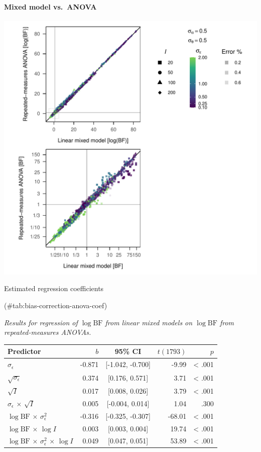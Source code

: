 \documentclass[
  a4paper,
  DIV=11,
  numbers=noendperiod,
  oneside]{scrartcl}
\let\oldparagraph\paragraph
\renewcommand{\paragraph}[1]{\oldparagraph{#1}\mbox{}}
\begin{document}
\hypertarget{mixed-model-vs.-anova}{%
\paragraph{Mixed model vs.~ANOVA}\label{mixed-model-vs.-anova}}

\includegraphics{prior_translation_files/figure-pdf/bias-correction-anova-1.pdf}

Estimated regression coefficients

(\#tab:bias-correction-anova-coef)

\emph{Results for regression of \(\log \mathrm{BF}\) from linear mixed
models on \(\log \mathrm{BF}\) from repeated-measures ANOVAs.}

\begin{longtable}[]{@{}lrcrr@{}}
\toprule()
Predictor & \(b\) & 95\% CI & \(t(1793)\) & \(p\) \\
\midrule()
\endhead
\(\sigma_\epsilon\) & -0.871 & {[}-1.042, -0.700{]} & -9.99 &
\textless{} .001 \\
\(\sqrt{\sigma_\epsilon}\) & 0.374 & {[}0.176, 0.571{]} & 3.71 &
\textless{} .001 \\
\(\sqrt{I}\) & 0.017 & {[}0.008, 0.026{]} & 3.79 & \textless{} .001 \\
\(\sigma_\epsilon\) \(\times\) \(\sqrt{I}\) & 0.005 & {[}-0.004,
0.014{]} & 1.04 & .300 \\
\(\log \mathrm{BF}\) \(\times\) \(\sigma_\epsilon^2\) & -0.316 &
{[}-0.325, -0.307{]} & -68.01 & \textless{} .001 \\
\(\log \mathrm{BF}\) \(\times\) \(\log I\) & 0.003 & {[}0.003, 0.004{]}
& 19.74 & \textless{} .001 \\
\(\log \mathrm{BF}\) \(\times\) \(\sigma_\epsilon^2\) \(\times\)
\(\log I\) & 0.049 & {[}0.047, 0.051{]} & 53.89 & \textless{} .001 \\
\bottomrule()
\end{longtable}
\end{document}
